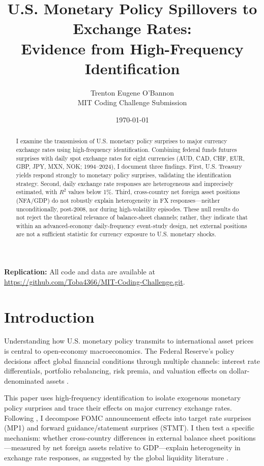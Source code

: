 \documentclass[12pt]{article}
\title{U.S. Monetary Policy Spillovers to Exchange Rates:\\
Evidence from High-Frequency Identification}
\author{Trenton Eugene O'Bannon\\MIT Coding Challenge Submission}
\date{\today}
\begin{document}
\maketitle

\begin{abstract}
I examine the transmission of U.S. monetary policy surprises to major currency exchange rates using high-frequency identification. Combining federal funds futures surprises with daily spot exchange rates for eight currencies (AUD, CAD, CHF, EUR, GBP, JPY, MXN, NOK; 1994--2024), I document three findings. First, U.S. Treasury yields respond strongly to monetary policy surprises, validating the identification strategy. Second, daily exchange rate responses are heterogeneous and imprecisely estimated, with $R^2$ values below 1\%. Third, cross-country net foreign asset positions (NFA/GDP) do not robustly explain heterogeneity in FX responses---neither unconditionally, post-2008, nor during high-volatility episodes. These null results do not reject the theoretical relevance of balance-sheet channels; rather, they indicate that within an advanced-economy daily-frequency event-study design, net external positions are not a sufficient statistic for currency exposure to U.S. monetary shocks.
\end{abstract}

\vspace{1em}
\noindent\textbf{Replication:} All code and data are available at \url{https://github.com/Toba4366/MIT-Coding-Challenge.git}.

\newpage
\tableofcontents
\newpage

\section{Introduction}

Understanding how U.S. monetary policy transmits to international asset prices is central to open-economy macroeconomics. The Federal Reserve's policy decisions affect global financial conditions through multiple channels: interest rate differentials, portfolio rebalancing, risk premia, and valuation effects on dollar-denominated assets \citep{rey2015dilemma, bruno2015cross}.

This paper uses high-frequency identification to isolate exogenous monetary policy surprises and trace their effects on major currency exchange rates. Following \citet{bauer2023reassessment}, I decompose FOMC announcement effects into target rate surprises (MP1) and forward guidance/statement surprises (STMT). I then test a specific mechanism: whether cross-country differences in external balance sheet positions---measured by net foreign assets relative to GDP---explain heterogeneity in exchange rate responses, as suggested by the global liquidity literature \citep{bruno2015cross, rey2015dilemma}.
\end{document}
